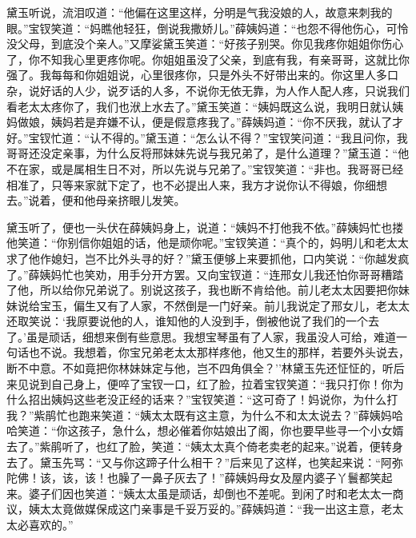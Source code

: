 黛玉听说，流泪叹道：``他偏在这里这样，分明是气我没娘的人，故意来刺我的眼。''宝钗笑道：``妈瞧他轻狂，倒说我撒娇儿。''薛姨妈道：``也怨不得他伤心，可怜没父母，到底没个亲人。''又摩娑黛玉笑道：``好孩子别哭。你见我疼你姐姐你伤心了，你不知我心里更疼你呢。你姐姐虽没了父亲，到底有我，有亲哥哥，这就比你强了。我每每和你姐姐说，心里很疼你，只是外头不好带出来的。你这里人多口杂，说好话的人少，说歹话的人多，不说你无依无靠，为人作人配人疼，只说我们看老太太疼你了，我们也洑上水去了。''黛玉笑道：``姨妈既这么说，我明日就认姨妈做娘，姨妈若是弃嫌不认，便是假意疼我了。''薛姨妈道：``你不厌我，就认了才好。''宝钗忙道：``认不得的。''黛玉道：``怎么认不得？''宝钗笑问道：``我且问你，我哥哥还没定亲事，为什么反将邢妹妹先说与我兄弟了，是什么道理？''黛玉道：``他不在家，或是属相生日不对，所以先说与兄弟了。''宝钗笑道：``非也。我哥哥已经相准了，只等来家就下定了，也不必提出人来，我方才说你认不得娘，你细想去。''说着，便和他母亲挤眼儿发笑。

黛玉听了，便也一头伏在薛姨妈身上，说道：``姨妈不打他我不依。''薛姨妈忙也搂他笑道：``你别信你姐姐的话，他是顽你呢。''宝钗笑道：``真个的，妈明儿和老太太求了他作媳妇，岂不比外头寻的好？''黛玉便够上来要抓他，口内笑说：``你越发疯了。''薛姨妈忙也笑劝，用手分开方罢。又向宝钗道：``连邢女儿我还怕你哥哥糟踏了他，所以给你兄弟说了。别说这孩子，我也断不肯给他。前儿老太太因要把你妹妹说给宝玉，偏生又有了人家，不然倒是一门好亲。前儿我说定了邢女儿，老太太还取笑说：`我原要说他的人，谁知他的人没到手，倒被他说了我们的一个去了。'虽是顽话，细想来倒有些意思。我想宝琴虽有了人家，我虽没人可给，难道一句话也不说。我想着，你宝兄弟老太太那样疼他，他又生的那样，若要外头说去，断不中意。不如竟把你林妹妹定与他，岂不四角俱全？''林黛玉先还怔怔的，听后来见说到自己身上，便啐了宝钗一口，红了脸，拉着宝钗笑道：``我只打你！你为什么招出姨妈这些老没正经的话来？''宝钗笑道：``这可奇了！妈说你，为什么打我？''紫鹃忙也跑来笑道：``姨太太既有这主意，为什么不和太太说去？''薛姨妈哈哈笑道：``你这孩子，急什么，想必催着你姑娘出了阁，你也要早些寻一个小女婿去了。''紫鹃听了，也红了脸，笑道：``姨太太真个倚老卖老的起来。''说着，便转身去了。黛玉先骂：``又与你这蹄子什么相干？''后来见了这样，也笑起来说：``阿弥陀佛！该，该，该！也臊了一鼻子灰去了！''薛姨妈母女及屋内婆子丫鬟都笑起来。婆子们因也笑道：``姨太太虽是顽话，却倒也不差呢。到闲了时和老太太一商议，姨太太竟做媒保成这门亲事是千妥万妥的。''薛姨妈道：``我一出这主意，老太太必喜欢的。''

